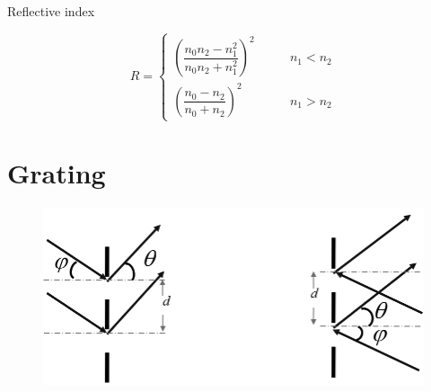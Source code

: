 Reflective index

\begin{equation*}
  R = \left\{
  \begin{aligned}
    \left( \dfrac{n_0 n_2 - n_1^2}{n_0 n_2 + n_1^2}  \right)^2 & \quad\quad n_1 < n_2 \\
    \left( \dfrac{n_0 - n_2}{n_0 + n_2}  \right)^2 & \quad\quad n_1 > n_2 
  \end{aligned}
  \right.
\end{equation*}

\section{Grating}

\begin{figure}[H]
  \centering
  \includegraphics[width=0.9\linewidth]{figures/grating.png}
\end{figure}


